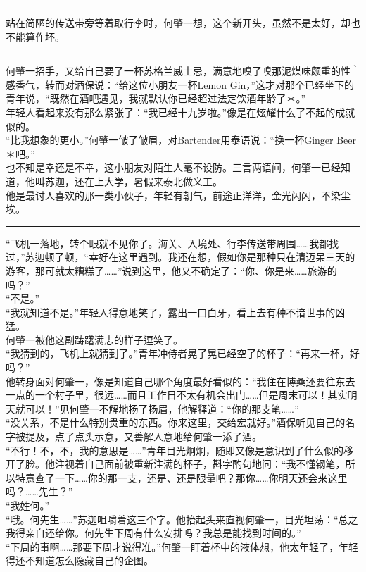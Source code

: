 \documentclass[oneside,11pt]{memoir} %
\begin{document}
\begin{CJK}{UTF8}{gbsn}
\rule{-3pt}{30pt}
    站在简陋的传送带旁等着取行李时，何肇一想，这个新开头，虽然不是太好，却也不能算作坏。
\rule{-3pt}{30pt}
    何肇一招手，又给自己要了一杯苏格兰威士忌，满意地嗅了嗅那泥煤味颇重的性｀感香气，转而对酒保说：“给这位小朋友一杯Lemon Gin，”这才对那个已经坐下的青年说，“既然在酒吧遇见，我就默认你已经超过法定饮酒年龄了＊。”\\\indent
    年轻人看起来没有那么紧张了：“我已经十九岁啦。”像是在炫耀什么了不起的成就似的。\\\indent
    “比我想象的更小。”何肇一皱了皱眉，对Bartender用泰语说：“换一杯Ginger Beer＊吧。”\\\indent
    也不知是幸还是不幸，这小朋友对陌生人毫不设防。三言两语间，何肇一已经知道，他叫苏迦，还在上大学，暑假来泰北做义工。\\\indent
    他是最讨人喜欢的那一类小伙子，年轻有朝气，前途正洋洋，金光闪闪，不染尘埃。\\\indent
\rule{-3pt}{30pt}
    “飞机一落地，转个眼就不见你了。海关、入境处、行李传送带周围……我都找过，”苏迦顿了顿，“幸好在这里遇到。我还在想，假如你是那种只在清迈呆三天的游客，那可就太糟糕了……”说到这里，他又不确定了：“你、你是来……旅游的吗？”\\\indent
    “不是。”\\\indent
    “我就知道不是。”年轻人得意地笑了，露出一口白牙，看上去有种不谙世事的凶猛。\\\indent
    何肇一被他这副踌躇满志的样子逗笑了。\\\indent
    “我猜到的，飞机上就猜到了。”青年冲侍者晃了晃已经空了的杯子：“再来一杯，好吗？”\\\indent
    他转身面对何肇一，像是知道自己哪个角度最好看似的：“我住在博桑还要往东去一点的一个村子里，很远……而且工作日不太有机会出门……但是周末可以！其实明天就可以！”见何肇一不解地扬了扬眉，他解释道：“你的那支笔……”\\\indent
    “没关系，不是什么特别贵重的东西。你来这里，交给宏就好。”酒保听见自己的名字被提及，点了点头示意，又善解人意地给何肇一添了酒。\\\indent
    “不行！不，不，我的意思是……”青年目光炯炯，随即又像是意识到了什么似的移开了脸。他注视着自己面前被重新注满的杯子，斟字酌句地问：“我不懂钢笔，所以特意查了一下……你的那一支，还是、还是限量吧？那你……你明天还会来这里吗？……先生？”\\\indent
    “我姓何。”\\\indent
    “哦。何先生……”苏迦咀嚼着这三个字。他抬起头来直视何肇一，目光坦荡：“总之我得亲自还给你。何先生下周有什么安排吗？我总是能找到时间的。”\\\indent
    “下周的事啊……那要下周才说得准。”何肇一盯着杯中的液体想，他太年轻了，年轻得还不知道怎么隐藏自己的企图。\\\indent

\end{CJK}
\end{document}
